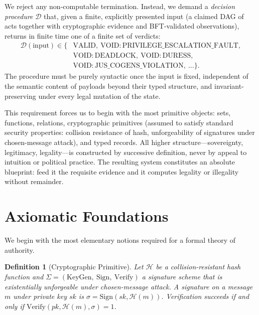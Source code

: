 \documentclass[11pt,a4paper]{article}
\newtheorem{definition}[theorem]{Definition}
\begin{document}
We reject any non-computable termination. Instead, we demand a \emph{decision procedure} \(\mathcal{D}\) that, given a finite, explicitly presented input (a claimed DAG of acts together with cryptographic evidence and BFT-validated observations), returns in finite time one of a finite set of verdicts:
\begin{equation*}
\begin{split}
\mathcal{D}(\text{input}) \in \{&\text{VALID},\ \text{VOID}:\text{PRIVILEGE\_ESCALATION\_FAULT}, \\
&\text{VOID}:\text{DEADLOCK},\ \text{VOID}:\text{DURESS}, \\
&\text{VOID}:\text{JUS\_COGENS\_VIOLATION},\ \dots \}.
\end{split}
\end{equation*}
The procedure must be purely syntactic once the input is fixed, independent of the semantic content of payloads beyond their typed structure, and invariant-preserving under every legal mutation of the state.  

This requirement forces us to begin with the most primitive objects: sets, functions, relations, cryptographic primitives (assumed to satisfy standard security properties: collision resistance of hash, unforgeability of signatures under chosen-message attack), and typed records. All higher structure---sovereignty, legitimacy, legality---is constructed by successive definition, never by appeal to intuition or political practice. The resulting system constitutes an absolute blueprint: feed it the requisite evidence and it computes legality or illegality without remainder.

\section{Axiomatic Foundations}

We begin with the most elementary notions required for a formal theory of authority.

\begin{definition}[Cryptographic Primitive]
Let \(\mathcal{H}\) be a collision-resistant hash function and \(\Sigma = (\text{KeyGen},\ \text{Sign},\ \text{Verify})\) a signature scheme that is existentially unforgeable under chosen-message attack. A \emph{signature} on a message \(m\) under private key \(sk\) is \(\sigma = \text{Sign}(sk, \mathcal{H}(m))\). Verification succeeds if and only if \(\text{Verify}(pk, \mathcal{H}(m), \sigma) = 1\).
\end{definition}
\end{document}

